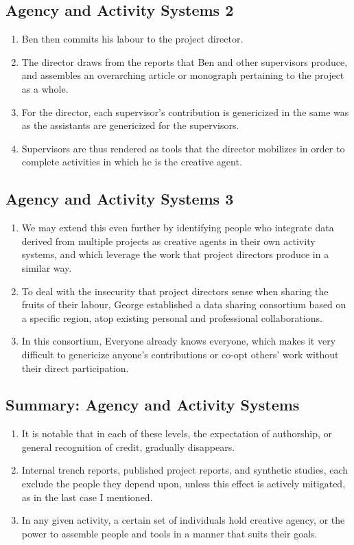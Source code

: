 \documentclass{article}
\begin{document}
\subsection{Agency and Activity Systems 2}
\begin{enumerate}
  \item Ben then commits his labour to the project director.
  \item The director draws from the reports that Ben and other supervisors produce, and assembles an overarching article or monograph pertaining to the project as a whole.
  \item For the director, each supervisor's contribution is genericized in the same was as the assistants are genericized for the supervisors.
  \item Supervisors are thus rendered as tools that the director mobilizes in order to complete activities in which he is the creative agent.
\end{enumerate}

\subsection{Agency and Activity Systems 3}
\begin{enumerate}
  \item We may extend this even further by identifying people who integrate data derived from multiple projects as creative agents in their own activity systems, and which leverage the work that project directors produce in a similar way.
  \item To deal with the insecurity that project directors sense when sharing the fruits of their labour, George established a data sharing consortium based on a specific region, atop existing personal and professional collaborations.
  \item In this consortium, Everyone already knows everyone, which makes it very difficult to genericize anyone's contributions or co-opt others' work without their direct participation.
\end{enumerate}

\subsection{Summary: Agency and Activity Systems}
\begin{enumerate}
  \item It is notable that in each of these levels, the expectation of authorship, or general recognition of credit, gradually disappears.
  \item Internal trench reports, published project reports, and synthetic studies, each exclude the people they depend upon, unless this effect is actively mitigated, as in the last case I mentioned.
  \item In any given activity, a certain set of individuals hold creative agency, or the power to assemble people and tools in a manner that suits their goals.
\end{enumerate}
\end{document}
